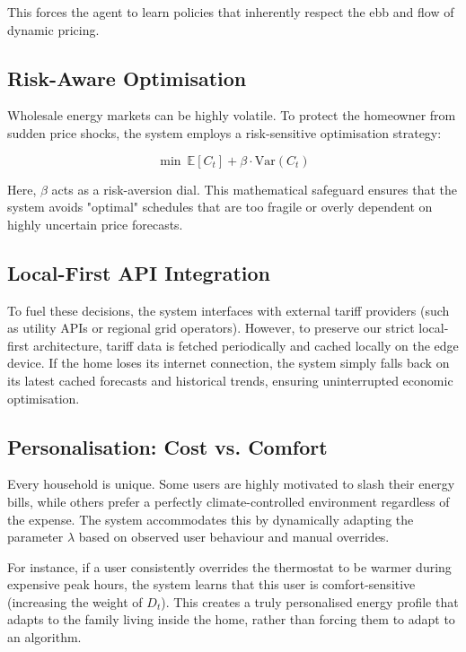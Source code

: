 \documentclass[11pt,a4paper]{article}
\begin{document}
This forces the agent to learn policies that inherently respect the ebb and flow of dynamic pricing.

\subsection{Risk-Aware Optimisation}

Wholesale energy markets can be highly volatile. To protect the homeowner from sudden price shocks, the system employs a risk-sensitive optimisation strategy:

$$\min \ \mathbb{E}[C_t] + \beta \cdot \text{Var}(C_t)$$

Here, $\beta$ acts as a risk-aversion dial. This mathematical safeguard ensures that the system avoids "optimal" schedules that are too fragile or overly dependent on highly uncertain price forecasts.

\subsection{Local-First API Integration}

To fuel these decisions, the system interfaces with external tariff providers (such as utility APIs or regional grid operators). However, to preserve our strict local-first architecture, tariff data is fetched periodically and cached locally on the edge device. If the home loses its internet connection, the system simply falls back on its latest cached forecasts and historical trends, ensuring uninterrupted economic optimisation.

\subsection{Personalisation: Cost vs. Comfort}

Every household is unique. Some users are highly motivated to slash their energy bills, while others prefer a perfectly climate-controlled environment regardless of the expense. The system accommodates this by dynamically adapting the parameter $\lambda$ based on observed user behaviour and manual overrides.

For instance, if a user consistently overrides the thermostat to be warmer during expensive peak hours, the system learns that this user is comfort-sensitive (increasing the weight of $D_t$). This creates a truly personalised energy profile that adapts to the family living inside the home, rather than forcing them to adapt to an algorithm.
\end{document}
